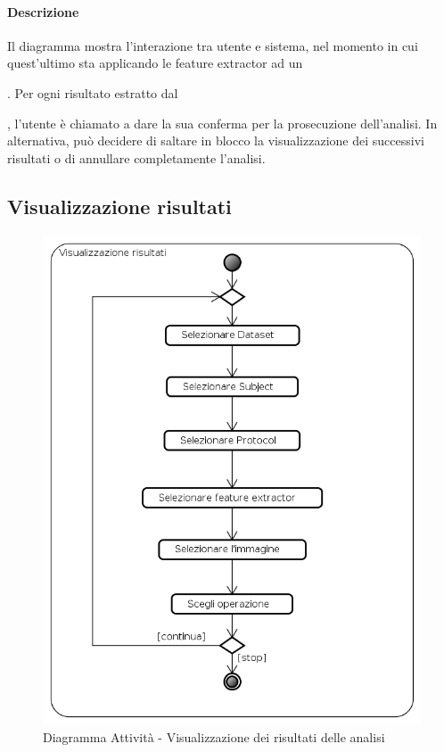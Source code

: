 \paragraph{Descrizione\\}
Il diagramma mostra l'interazione tra utente e sistema, nel momento in cui quest'ultimo sta applicando le feature extractor\glossario{} ad un \subject{}. Per ogni risultato estratto dal \subject{}, l'utente è chiamato a dare la sua conferma per la prosecuzione dell'analisi. In alternativa, può decidere di saltare in blocco la visualizzazione dei successivi risultati o di annullare completamente l'analisi.
\pagebreak

\subsection{Visualizzazione risultati}
\label{seeAnalysis}
\begin{figure}[!h]
	\centering
	\includegraphics[scale=0.6]{./img/Diagrammi_Attivita/Visualizzazione_risultati}
	\caption{Diagramma Attività - Visualizzazione dei risultati delle analisi}
	\label{showAnalysis}
\end{figure}
